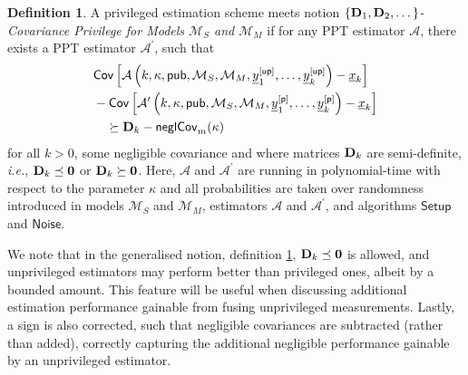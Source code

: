 \documentclass[conference]{IEEEtran}
\theoremstyle{definition}
\newtheorem{definition}{Definition}[section]
\theoremstyle{remark}
\begin{document}
\begin{definition}\label{def:cov_priv_security_notion}
  A privileged estimation scheme meets notion \textit{$\{{{\mathbf{D}}}_1,{{\mathbf{D}}}_2,\dots\}$-Covariance Privilege for Models $\mathcal{M}_S$ and $\mathcal{M}_M$} if for any PPT estimator $\mathcal{A}$, there exists a PPT estimator $\mathcal{A}^\prime$, such that
  \begin{equation}
    \begin{split}
      &\mathsf{Cov}\left[\mathcal{A}\left(k,\kappa,\mathsf{pub},\mathcal{M}_S,\mathcal{M}_M,{\underline{y}}^{[\mathsf{up}]}_1,\dots,{\underline{y}}^{[\mathsf{up}]}_k\right) - {\underline{x}}_k\right]\\
      &-\mathsf{Cov}\left[\mathcal{A}^\prime\left(k,\kappa,\mathsf{pub},\mathcal{M}_S,\mathcal{M}_M,{\underline{y}}^{[\mathsf{p}]}_1,\dots,{\underline{y}}^{[\mathsf{p}]}_k\right) - {\underline{x}}_k\right]\\
      &\quad\succeq {\ensuremath{{\mathbf{D}}}}_k - \mathsf{neglCov}_m(\kappa)
    \end{split}
  \end{equation}
  for all $k>0$, some negligible covariance and where matrices ${{\mathbf{D}}}_k$ are semi-definite, \textit{i.e.}, ${{\mathbf{D}}}_k \preceq {\ensuremath{{\mathbf{0}}}}$ or ${{\mathbf{D}}}_k \succeq {\ensuremath{{\mathbf{0}}}}$. Here, $\mathcal{A}$ and $\mathcal{A}^\prime$ are running in polynomial-time with respect to the parameter $\kappa$ and all probabilities are taken over randomness introduced in models $\mathcal{M}_S$ and $\mathcal{M}_M$, estimators $\mathcal{A}$ and $\mathcal{A}^\prime$, and algorithms $\mathsf{Setup}$ and $\mathsf{Noise}$.
\end{definition}

We note that in the generalised notion, definition \ref{def:cov_priv_security_notion}, ${{\mathbf{D}}}_k\preceq {\ensuremath{{\mathbf{0}}}}$ is allowed, and unprivileged estimators may perform better than privileged ones, albeit by a bounded amount. This feature will be useful when discussing additional estimation performance gainable from fusing unprivileged measurements. Lastly, a sign is also corrected, such that negligible covariances are subtracted (rather than added), correctly capturing the additional negligible performance gainable by an unprivileged estimator.

% 
%                                                                      
%                                                                      
%                                                                      
% 
\end{document}
